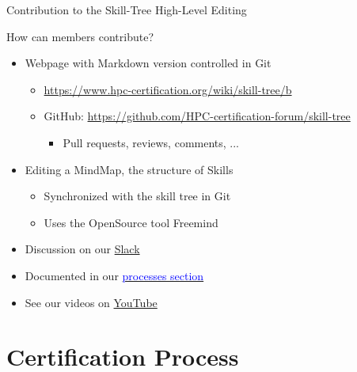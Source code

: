 \documentclass[compress,aspectratio=169]{beamer}
\newcommand{\hrefb}[2]{\href{#1}{\textcolor{blue}{#2}}}
\begin{document}
\begin{frame}{Contribution to the Skill-Tree High-Level Editing}

  \begin{block}{How can members contribute?}
  \begin{itemize}
    \item Webpage with Markdown version controlled in Git
      \begin{itemize}
        \item \url{https://www.hpc-certification.org/wiki/skill-tree/b}
        \item GitHub: \url{https://github.com/HPC-certification-forum/skill-tree}
        \begin{itemize}
          \item Pull requests, reviews, comments, ...
        \end{itemize}
      \end{itemize}
    \item Editing a MindMap, the structure of Skills
      \begin{itemize}
        \item Synchronized with the skill tree in Git
        \item Uses the OpenSource tool Freemind
      \end{itemize}
    \item Discussion on our \href{https://join.slack.com/t/hpc-certification/shared_invite/enQtMzUwNzU3NzM2MTkzLTAzZWM3NDg0N2I2ZmQwOWI5ZGUwNjNlNDgzM2RmOTM3ZWRjNjIxYTc5NzUxYTJhNmRlNmM5YmE1NDY3YzkzYzA}{Slack}
    \item Documented in our \hrefb{https://www.hpc-certification.org/processes/}{processes section}
    \item See our videos on \href{https://www.youtube.com/playlist?list=PL4b682pSp7MQbdhhvwisrPo7PjYya26_g}{YouTube}
  \end{itemize}
  \end{block}
\end{frame}



\section{Certification Process}
\sectionIntroHidden
\end{document}
